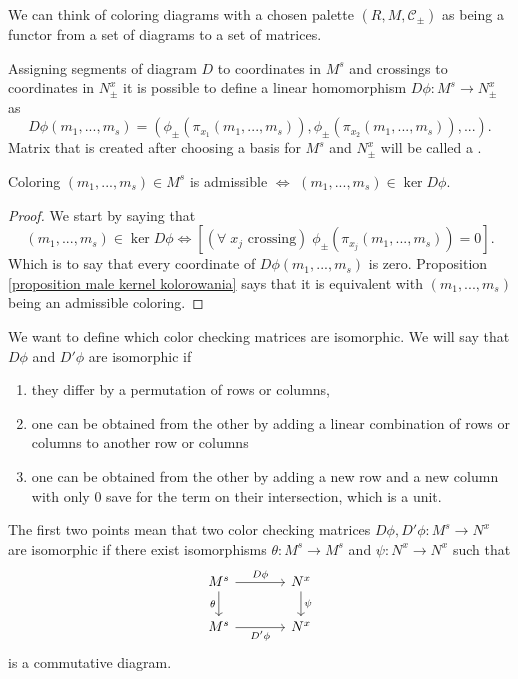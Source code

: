 We can think of coloring diagrams with a chosen palette $(R, M, \mathcal{C}_\pm)$ as being a {\color{red}functor from a set of diagrams to a set of matrices}.

\begin{definition}\label{def:color checking matrix}
  Assigning segments of diagram $D$ to coordinates in $M^s$ and crossings to coordinates in $N_\pm^x$ it is possible to define a linear homomorphism $D\phi:M^s\to N_\pm^x$  as
  $$D\phi(m_1,...,m_s)=(\phi_\pm(\pi_{x_1}(m_1,...,m_s)), \phi_\pm(\pi_{x_2}(m_1,...,m_s)),...).$$
  Matrix that is created after choosing a basis for $M^s$ and $N_\pm^x$ will be called a .
\end{definition}

\begin{proposition}
  Coloring $(m_1,...,m_s)\in M^s$ is admissible $\iff$ $(m_1,...,m_s)\in\ker D\phi$.
\end{proposition}

\begin{proof}
  We start by saying that 
  $$(m_1,..., m_s)\in\ker D\phi\iff [(\forall\;x_j\text{ crossing})\;\phi_\pm(\pi_{x_j}(m_1,..., m_s))=0].$$
  Which is to say that every coordinate of $D\phi(m_1,..., m_s)$ is zero. Proposition \cref{proposition male kernel kolorowania} says that it is equivalent with $(m_1,..., m_s)$ being an admissible coloring.
\end{proof}

We want to define which color checking matrices are isomorphic. We will say that $D\phi$ and $D'\phi$ are isomorphic if 
\begin{enumerate}
  \item they differ by a permutation of rows or columns, 
  \item one can be obtained from the other by adding a linear combination of rows or columns to another row or columns 
  \item one can be obtained from the other by adding a new row and a new column with only $0$ save for the term on their intersection, which is a unit.
\end{enumerate}
The first two points mean that two color checking matrices $D\phi, D'\phi:M^s\to N^x$ are isomorphic if there exist isomorphisms $\theta:M^s\to M^s$ and $\psi:N^x\to N^x$ such that
$$
\begin{tikzcd}[column sep=large]
  M^s\arrow[r, "D\phi"]\arrow[d, "\theta" left] & N^x\arrow[d, "\psi" right]\\ 
  M^s\arrow[r, "D'\phi" below] & N^x
\end{tikzcd}
$$
is a commutative diagram. 

